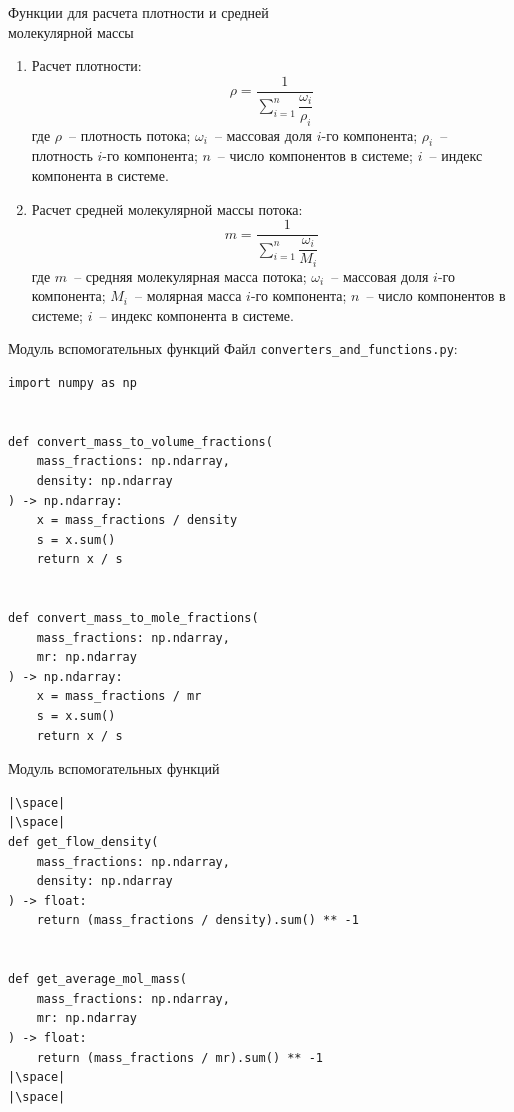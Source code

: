 \documentclass[aspectratio=169, mathserif]{beamer}	%
\begin{document}
\begin{frame}[fragile]{Функции для расчета плотности и средней \\ молекулярной массы}
\scriptsize
\begin{enumerate}
\item Расчет плотности:
\vfill
\begin{equation*}
	\rho = \dfrac{1}{\sum \limits_{i=1}^{n}\dfrac{\omega_i}{\rho_i}}
\end{equation*}
\vfill
где $\rho$~-- плотность потока; $\omega _i$~-- массовая доля $i$-го компонента; $\rho _i$~-- плотность $i$-го компонента; $n$~-- число компонентов в системе; $i$~-- индекс компонента в системе.
\vfill
\item Расчет средней молекулярной массы потока:
\vfill
$$
	m = \dfrac{1}{\sum \limits_{i=1}^{n}\dfrac{\omega_i}{M_i}}
$$
\vfill
где $m$~-- средняя молекулярная масса потока; $\omega _i$~-- массовая доля $i$-го компонента; $M_i$~-- молярная масса $i$-го компонента; $n$~-- число компонентов в системе; $i$~-- индекс компонента в системе.
\vfill
\end{enumerate}
\vfill
\end{frame}

\begin{frame}[fragile]{Модуль вспомогательных функций}
\scriptsize
Файл \texttt{converters\_and\_functions.py}:
\vfill
\begin{verbatim}
import numpy as np


def convert_mass_to_volume_fractions(
    mass_fractions: np.ndarray,
    density: np.ndarray
) -> np.ndarray:
    x = mass_fractions / density
    s = x.sum()
    return x / s


def convert_mass_to_mole_fractions(
    mass_fractions: np.ndarray,
    mr: np.ndarray
) -> np.ndarray:
    x = mass_fractions / mr
    s = x.sum()
    return x / s
\end{verbatim}
\vfill
\end{frame}

\begin{frame}[fragile]{Модуль вспомогательных функций}
\scriptsize
\begin{verbatim}
|\space|
|\space|
def get_flow_density(
    mass_fractions: np.ndarray,
    density: np.ndarray
) -> float:
    return (mass_fractions / density).sum() ** -1


def get_average_mol_mass(
    mass_fractions: np.ndarray,
    mr: np.ndarray
) -> float:
    return (mass_fractions / mr).sum() ** -1
|\space|
|\space|
\end{verbatim}
\vfill
\end{frame}
\end{document}
